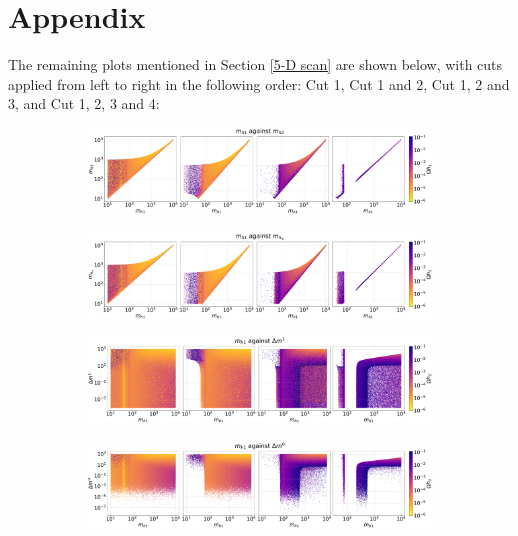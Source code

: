 \documentclass[12pt]{article}
\begin{document}
\section{Appendix}
The remaining plots mentioned in Section \ref{5-D scan} are shown below, with cuts applied from left to right in the following order: Cut 1, Cut 1 and 2, Cut 1, 2 and 3, and Cut 1, 2, 3 and 4:
\begin{figure}[H]
    \begin{subfigure}{\textwidth}
      \centering
      \includegraphics[width=1\columnwidth]{4plot/MD1_MD2.pdf}
    \end{subfigure}

    \begin{subfigure}{\textwidth}
      \centering
      \includegraphics[width=1\columnwidth]{4plot/MD1_MDP.pdf}
    \end{subfigure}
    
    \begin{subfigure}{\textwidth}
      \centering
      \includegraphics[width=1\columnwidth]{4plot/MD1_DM2.pdf}
    \end{subfigure}
    
    \begin{subfigure}{\textwidth}
      \centering
      \includegraphics[width=1\columnwidth]{4plot/MD1_DM3.pdf}
    \end{subfigure}


\end{figure}
\end{document}
